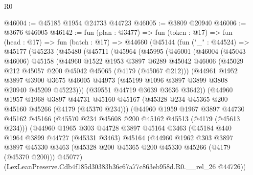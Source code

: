 \begin{lexlean}{R0}
\begin{coremodule}
@46004 := @45185 @1954 @24733 @44723
@46005 := @3809 @20940
@46006 := @3676 @46005
@46142 := fun (plan : @3477) =>
  fun (token : @17) =>
  fun (head : @17) =>
  fun (batch : @17) =>
  @44660
    (@45144
      (fun ("_" : @44524) =>
      @45177
        (@45233
          (@45480
            (@45711
              (@45964
                (@45995
                  (@46001
                    (@46004
                      (@45043 @46006)
                      @45158
                      (@44960
                        @1522
                        @1953
                        @3897
                        @6289
                        @45042
                        @46006
                        (@45029 @212 @45057 @200 @45042 @45065 (@4179 (@45067 @212)))
                        (@44961
                          @1952
                          @3897
                          @3900
                          @3675
                          @46005
                          @44973
                          (@45199 @1096 @3897 @3899 @3808 @20940 @45209 @45223)))
                      (@39551 @44719 @3639 @3636 @3642))
                    (@44960
                      @1957
                      @1968
                      @3897
                      @44731
                      @45160
                      @45167
                      (@45328 @234 @45365 @200 @45160 @45266 (@4179 (@45370 @234)))
                      (@44960
                        @1959
                        @1967
                        @3897
                        @44730
                        @45162
                        @45166
                        (@45570 @234 @45608 @200 @45162 @45513 (@4179 (@45613 @234)))
                        (@44960
                          @1965
                          @303
                          @44728
                          @3897
                          @45164
                          @3463
                          (@45184
                            @440
                            @1964
                            @3899
                            @44727
                            (@45331 @3463)
                            @45164
                            (@44960
                              @1962
                              @303
                              @3897
                              @3897
                              @45330
                              @3463
                              (@45328 @200 @45365 @200 @45330 @45266 (@4179 (@45370 @200)))
                              @45077)
                            (LexLeanPreserve.Cdb4f185d30383b36c67a77c863eb958d.R0.__rel_26 @44726))

\end{coremodule}
\end{lexlean}
